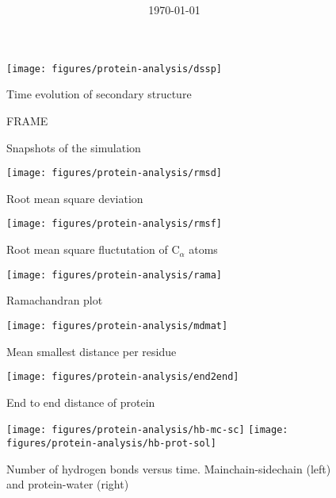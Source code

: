 \documentclass[12pt]{article}
\title{\bf  }
\date{\today}
\begin{document}
\maketitle

\begin{figure}[!ht]
  \centering
  \texttt{[image: figures/protein-analysis/dssp]}
  \centering
  \caption{Time evolution of secondary structure}
  \label{fig:dssp}
\end{figure}

\begin{figure}[!ht]
  \centering
    FRAME
  \caption{Snapshots of the simulation}
  \label{fig:snapshots}
\end{figure}

\begin{figure}[!ht]
  \begin{minipage}{0.45\textwidth}
    \centering
    \texttt{[image: figures/protein-analysis/rmsd]}
    \caption{Root mean square deviation}
    \label{fig:rmsd}
  \end{minipage}
  \begin{minipage}{0.45\textwidth}
    \centering
    \texttt{[image: figures/protein-analysis/rmsf]}
    \caption{Root mean square fluctutation of C$_{\alpha}$ atoms}
    \label{fig:rmsf}
  \end{minipage}
\end{figure}

\begin{figure}[!ht]
  \begin{minipage}{0.45\textwidth}
    \centering
    \texttt{[image: figures/protein-analysis/rama]}
    \caption{Ramachandran plot}
    \label{fig:rama}
  \end{minipage}
  \begin{minipage}{0.45\textwidth}
    \centering
    \texttt{[image: figures/protein-analysis/mdmat]}
    \caption{Mean smallest distance per residue}
    \label{fig:mdmat}
  \end{minipage}
\end{figure}

\begin{figure}[!ht]
  \centering
  \texttt{[image: figures/protein-analysis/end2end]}
  \centering
  \caption{End to end distance of protein}
  \label{fig:end2end}
\end{figure}

\begin{figure}[!ht]
  \centering
  \texttt{[image: figures/protein-analysis/hb-mc-sc]}
  \texttt{[image: figures/protein-analysis/hb-prot-sol]}
  \centering
  \caption{Number of hydrogen bonds versus time. Mainchain-sidechain (left) and protein-water (right)}
  \label{fig:hb}
\end{figure}
\end{document}
